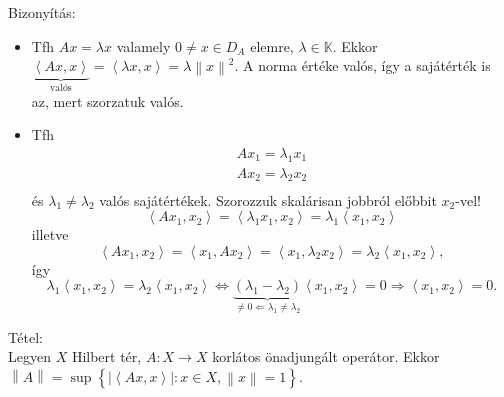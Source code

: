 \documentclass[12pt,a4paper]{scrartcl}
\providecommand{\tightlist}{%
  \setlength{\itemsep}{0pt}\setlength{\parskip}{0pt}}
\newenvironment{tetel}{}{}
\newenvironment{bizonyitas}{}{}
\begin{document}
\begin{bizonyitas}

Bizonyítás:

\begin{itemize}
\tightlist
\item
  Tfh \(Ax = \lambda x\) valamely \(0 \neq x \in D_{A}\) elemre,
  \(\lambda \in {\mathbb{K}}\). Ekkor
  \(\underbrace {\left\langle {Ax,x} \right\rangle }_{{\text{valós}}} = \left\langle {\lambda x,x} \right\rangle = \lambda {\left\| x \right\|^2}\).
  A norma értéke valós, így a sajátérték is az, mert szorzatuk valós.
\item
  Tfh \[\begin{array}{l}
  {Ax_{1} = \lambda_{1}x_{1}} \\
  {Ax_{2} = \lambda_{2}x_{2}} \\
  \end{array}\] és \(\lambda_{1} \neq \lambda_{2}\) valós sajátértékek.
  Szorozzuk skalárisan jobbról előbbit \(x_{2}\)-vel!
  \[\left\langle {Ax_{1},x_{2}} \right\rangle = \left\langle {\lambda_{1}x_{1},x_{2}} \right\rangle = \lambda_{1}\left\langle {x_{1},x_{2}} \right\rangle\]illetve
  \[\left\langle {Ax_{1},x_{2}} \right\rangle = \left\langle {x_{1},Ax_{2}} \right\rangle = \left\langle {x_{1},\lambda_{2}x_{2}} \right\rangle = \lambda_{2}\left\langle {x_{1},x_{2}} \right\rangle,\]így
  \[{\lambda _1}\left\langle {{x_1},{x_2}} \right\rangle  = {\lambda _2}\left\langle {{x_1},{x_2}} \right\rangle  \Leftrightarrow \underbrace {\left( {{\lambda _1} - {\lambda _2}} \right)}_{ \ne 0 \Leftarrow {\lambda _1} \ne {\lambda _2}}\left\langle {{x_1},{x_2}} \right\rangle  = 0 \Rightarrow \left\langle {{x_1},{x_2}} \right\rangle  = 0.\]
\end{itemize}

\end{bizonyitas}

\begin{tetel}

Tétel:\\
Legyen \(X\) Hilbert tér, \(\left. A:X\rightarrow X \right.\) korlátos
önadjungált operátor. Ekkor
\(\left\| A \right\| = \sup\left\{ {\left| \left\langle {Ax,x} \right\rangle \right|:x \in X,\left\| x \right\| = 1} \right\}\).

\end{tetel}
\end{document}
